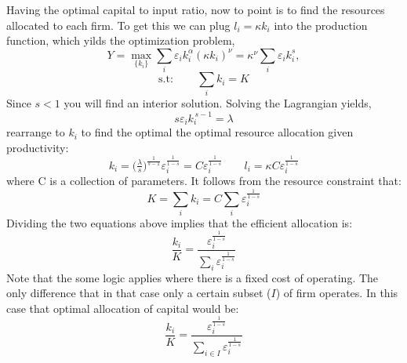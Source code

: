 \documentclass[12pt]{article}
\begin{document}
Having the optimal capital to input ratio, now to point is to find the resources allocated to each firm. To get this we can plug  $l_i = \kappa k_i$ into the production function, which yilds the optimization problem, 
$$  Y =  \max_{\{k_i\}}  \sum_i \varepsilon_i k_i^{\alpha}(\kappa k_i)^{\nu}
= \kappa^{\nu}\sum_i \varepsilon_i k_i^{s}, $$
$$ \text{s.t}: \qquad \sum_i k_i= K $$
Since $s < 1$ you will find an interior solution. Solving the Lagrangian yields,
$$  s \varepsilon_i k_i^{\,s-1}=\lambda $$ 
rearrange to $k_i$ to find the optimal the optimal resource allocation given productivity: 
$$ k_i =  \Big(\tfrac{\lambda}{s}\Big)^{\!\frac{1}{s-1}} \varepsilon_i^{\frac{1}{1-s}} =  C \varepsilon_i^{\frac{1}{1-s}} \qquad l_i = \kappa C \varepsilon_i^{\frac{1}{1-s}} $$
where C is a collection of parameters. It follows from the resource constraint that: 
$$ K=\sum_i k_i = C \sum_i \varepsilon_i^{\frac{1}{1-s}} $$
Dividing the two equations above implies that the efficient allocation is: 
$$ \frac{k_i}{K} =  \frac{ \varepsilon_i^{\frac{1}{1-s}}}{\sum_i \varepsilon_i^{\frac{1}{1-s}}}  $$
Note that the some logic applies where there is a fixed cost of operating. The only difference that in that case only a certain subset ($I$) of firm operates. In this case that optimal allocation of capital would be: 
$$ \frac{k_i}{K} =  \frac{ \varepsilon_i^{\frac{1}{1-s}}}{\sum_{i \in I} \varepsilon_i^{\frac{1}{1-s}}}  $$
\end{document}
